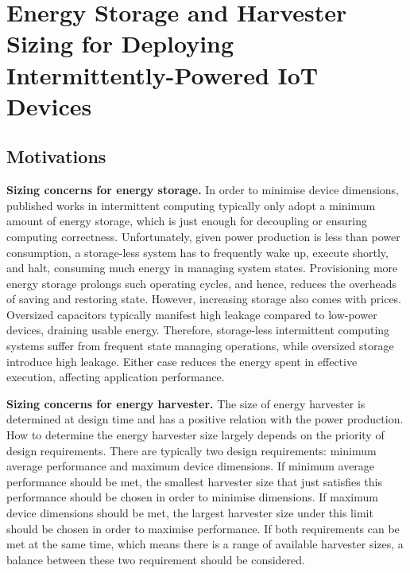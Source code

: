 \chapter{Energy Storage and Harvester Sizing for Deploying Intermittently-Powered IoT Devices} \label{Chapter:Work1}

\setlength{\headheight}{26pt}

\section{Motivations}

\textbf{Sizing concerns for energy storage.} In order to minimise device dimensions, published works in intermittent computing typically only adopt a minimum amount of energy storage, which is just enough for decoupling or ensuring computing correctness. Unfortunately, given power production is less than power consumption, a storage-less system has to frequently wake up, execute shortly, and halt, consuming much energy in managing system states. Provisioning more energy storage prolongs such operating cycles, and hence, reduces the overheads of saving and restoring state. However, increasing storage also comes with prices. Oversized capacitors typically manifest high leakage compared to low-power devices, draining usable energy. Therefore, storage-less intermittent computing systems suffer from frequent state managing operations, while oversized storage introduce high leakage. Either case reduces the energy spent in effective execution, affecting application performance. 

\textbf{Sizing concerns for energy harvester.} 
The size of energy harvester is determined at design time and has a positive relation with the power production. How to determine the energy harvester size largely depends on the priority of design requirements. There are typically two design requirements: minimum average performance and maximum device dimensions. If minimum average performance should be met, the smallest harvester size that just satisfies this performance should be chosen in order to minimise dimensions. If maximum device dimensions should be met, the largest harvester size under this limit should be chosen in order to maximise performance. If both requirements can be met at the same time, which means there is a range of available harvester sizes, a balance between these two requirement should be considered. 

